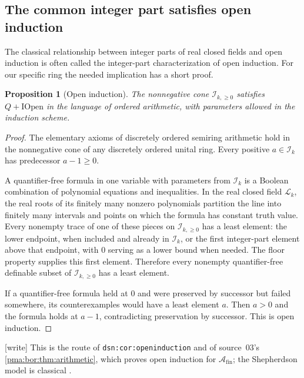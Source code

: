 \documentclass[11pt]{article}
\numberwithin{equation}{section}
\newtheorem{proposition}[proposition]{Proposition}
\theoremstyle{definition}
\theoremstyle{remark}
\newcommand{\A}{\mathcal A_{\mathrm{fin}}}
\newcommand{\writetag}{\textup{\textsf{\small[write]}}}
\newcommand{\replabel}[1]{\nolinkurl{#1}}
\newcommand{\Lk}{\mathcal L_k}
\newcommand{\Ik}{\mathcal I_k}
\begin{document}
\subsection{The common integer part satisfies open induction}

The classical relationship between integer parts of real closed fields and
open induction is often called the integer-part characterization of open
induction. For our specific ring the needed implication has a short proof.

\begin{proposition}[Open induction]\label{pma:ser:prop:iopen}
The nonnegative cone $\mathcal I_{k,\geq0}$ satisfies $Q+\mathrm{IOpen}$ in the
language of ordered arithmetic, with parameters allowed in the induction
scheme.
\end{proposition}
\begin{proof}
The elementary axioms of discretely ordered semiring arithmetic hold in the
nonnegative cone of any discretely ordered unital ring. Every positive
$a\in\Ik$ has predecessor $a-1\geq0$.

A quantifier-free formula in one variable with parameters from $\Ik$ is a
Boolean combination of polynomial equations and inequalities. In the real
closed field $\Lk$, the real roots of its finitely many nonzero polynomials
partition the line into finitely many intervals and points on which the
formula has constant truth value. Every nonempty trace of one of these pieces
on $\mathcal I_{k,\geq0}$ has a least element: the lower endpoint, when included and
already in $\Ik$, or the first integer-part element above that endpoint,
with $0$ serving as a lower bound when needed. The floor property supplies
this first element. Therefore every nonempty quantifier-free definable subset
of $\mathcal I_{k,\geq0}$ has a least element.

If a quantifier-free formula held at $0$ and were preserved by successor but
failed somewhere, its counterexamples would have a least element $a$.
Then $a>0$ and the formula holds at $a-1$, contradicting preservation by
successor. This is open induction.
\end{proof}

\noindent\writetag{} This is the route of \replabel{dsn:cor:openinduction} and
of source~03's \cref{pma:bor:thm:arithmetic}, which proves open induction for
$\A$; the Shepherdson model is classical \cite{Shepherdson}.
\end{document}
